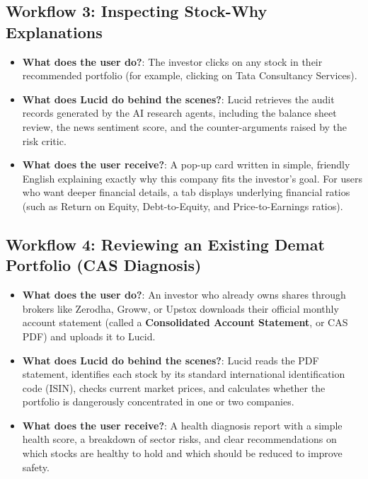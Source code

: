 \subsection{Workflow 3: Inspecting Stock-Why Explanations}
\begin{itemize}
    \item \textbf{What does the user do?}: The investor clicks on any stock in their recommended portfolio (for example, clicking on Tata Consultancy Services).
    \item \textbf{What does Lucid do behind the scenes?}: Lucid retrieves the audit records generated by the AI research agents, including the balance sheet review, the news sentiment score, and the counter-arguments raised by the risk critic.
    \item \textbf{What does the user receive?}: A pop-up card written in simple, friendly English explaining exactly why this company fits the investor's goal. For users who want deeper financial details, a tab displays underlying financial ratios (such as Return on Equity, Debt-to-Equity, and Price-to-Earnings ratios).
\end{itemize}

\subsection{Workflow 4: Reviewing an Existing Demat Portfolio (CAS Diagnosis)}
\begin{itemize}
    \item \textbf{What does the user do?}: An investor who already owns shares through brokers like Zerodha, Groww, or Upstox downloads their official monthly account statement (called a \textbf{Consolidated Account Statement}, or CAS PDF) and uploads it to Lucid.
    \item \textbf{What does Lucid do behind the scenes?}: Lucid reads the PDF statement, identifies each stock by its standard international identification code (ISIN), checks current market prices, and calculates whether the portfolio is dangerously concentrated in one or two companies.
    \item \textbf{What does the user receive?}: A health diagnosis report with a simple health score, a breakdown of sector risks, and clear recommendations on which stocks are healthy to hold and which should be reduced to improve safety.
\end{itemize}

